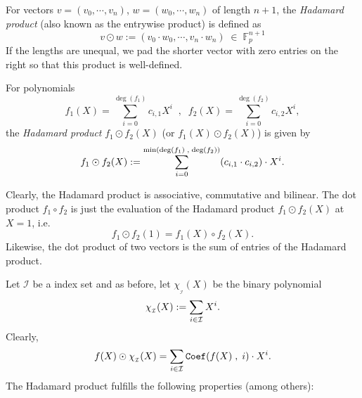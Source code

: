 \documentclass[11pt, lettersize, notitlepage, leqno, footskip=0.6cm]{article}
\newcommand{\bFp}{\mathbb{F}_p}
\newcommand{\mc}{\mathcal}
\newcommand{\mr}{\mathrm}
\newcommand{\vs}{\vspace{-0.15cm}}
\newcommand{\noin}{\noindent}
\numberwithin{equation}{section}
\begin{document}
For vectors $v = (v_0,\cdots,v_n)$, $w = (w_0,\cdots,w_n)$ of length $n+1$, the \textit{Hadamard product} (also known as the entrywise product) is defined as \vs $$ v\odot w:=  (v_0\cdot w_0,\cdots,v_n\cdot w_n)\;\in\; \bFp^{n+1}  $$ If the lengths are unequal, we pad the shorter vector with zero entries on the right so that this product is well-defined.

\begin{comment}

In this subsection, we provide a protocol that allows a Prover to show that the Hadamard product of two committed vectors/polynomials is the zero vector. Our primary use case for this protocol is the zero-knowledge batched membership proof. 


Clearly, the Hadamard product is zero if and only if for each index $i$, at least one of $v_i$ and $w_i$ is $0$. This, in turn is equivalent to the sum $\sum_{i=0}^n\gamma^i\cdot(v_i\cdot w_i) $ being $0$ for a randomly generated challenge $\gamma$. This happens to be the coefficient of $X^{\deg(f_2)}$ in the product $f_1(\gamma X)\cdot f_2^{\mr{Rev}}(X)$, where \vs $$ f_1(X) = \sum v_iX^i\;\;,\;\; f_2(X) = \sum w_iX^i $$ Thus, the Prover can combine the protocols $\hyperlink{Coeff}{\tt{ZKPoCoef}}$, $\hyperlink{Prod}{\tt{ZKPoProd}}$,  $\hyperlink{Deg}{\tt{ZKPoDeg}}$, $\hyperlink{Const}{\tt{ZKPoConst}}$, $\hyperlink{Rev}{\tt{ZKPoRev}}$ to succinctly prove the statement.

\end{comment}


For polynomials \vs $$f_1(X) = \sum\limits_{i=0}^{\deg(f_1)} c_{i,1} X^i\;\;,\;\; f_2(X) = \sum\limits_{i=0}^{\deg(f_2)} c_{i,2} X^i, $$ the \textit{Hadamard product} $f_1\odot f_2(X)$ (or $f_1(X)\odot f_2(X)$) is given by \vs $$f_1\odot f_2(X) := \sum\limits_{i=0}^{\min(\deg(f_1)\;,\;\deg(f_2))} (c_{i,1}\cdot c_{i,2}) \cdot X^i .\vs $$

\noin Clearly, the Hadamard product is associative, commutative and bilinear. The dot product $f_1\circ f_2$ is just the evaluation of the Hadamard product $f_1\odot f_2(X)$ at $X=1$, i.e. $$ f_1\odot f_2(1) = f_1(X)\circ f_2(X). $$ Likewise, the dot product of two vectors is the sum of entries of the Hadamard product. \vspace{2mm}

Let $\mc{I}$ be a index set and as before, let $\chi_{_\mc{I}}(X)$ be the binary polynomial $$ \chi_{_\mc{I}}(X):= \sum\limits_{i\in \mc{I}} X^i. \vs $$ Clearly, $$ f(X)\odot \chi_{_\mc{I}}(X) = \sum\limits_{i\in \mc{I}} {\tt{Coef}}(f(X)\;,\;i)\cdot X^i.  $$ The Hadamard product fulfills the following properties (among others): \vspace{2mm}
\end{document}
